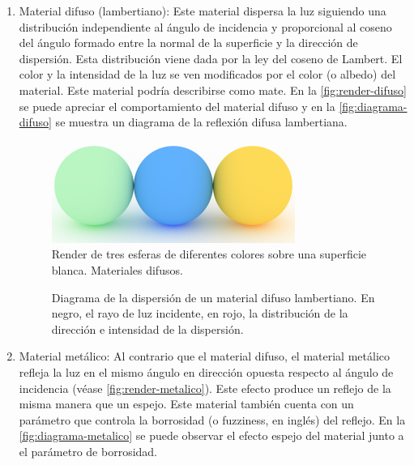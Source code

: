 \documentclass[10pt, a4paper]{article}
\begin{document}
\begin{enumerate}
    
\item Material difuso (lambertiano): Este material dispersa la luz siguiendo una distribución independiente al ángulo de incidencia y proporcional al coseno del ángulo formado entre la normal de la superficie y la dirección de dispersión. Esta distribución viene dada por la ley del coseno de Lambert. El color y la intensidad de la luz se ven modificados por el color (o albedo) del material. Este material podría describirse como mate. En la \autoref{fig:render-difuso} se puede apreciar el comportamiento del material difuso y en la \autoref{fig:diagrama-difuso} se muestra un diagrama de la reflexión difusa lambertiana.

\begin{figure}[H]
    \includegraphics[width=0.75\textwidth]{02_crop}
    \caption{Render de tres esferas de diferentes colores sobre una superficie blanca. Materiales difusos.}
    \label{fig:render-difuso}
\end{figure}

\begin{figure}[H]
    \centering 
    
    \caption{Diagrama de la dispersión de un material difuso lambertiano. En negro, el rayo de luz incidente, en rojo, la distribución de la dirección e intensidad de la dispersión.}
    \label{fig:diagrama-difuso}
\end{figure}

\item Material metálico: Al contrario que el material difuso, el material metálico refleja la luz en el mismo ángulo en dirección opuesta respecto al ángulo de incidencia (véase \autoref{fig:render-metalico}). Este efecto produce un reflejo de la misma manera que un espejo. Este material también cuenta con un parámetro que controla la borrosidad (o fuzziness, en inglés) del reflejo. En la \autoref{fig:diagrama-metalico} se puede observar el efecto espejo del material junto a el parámetro de borrosidad.


\end{enumerate}
\end{document}
